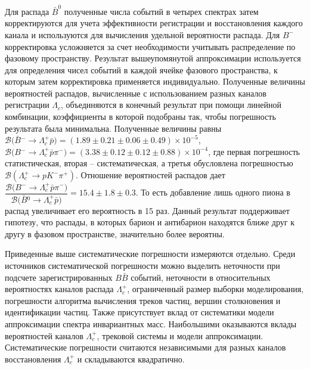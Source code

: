 \documentclass[a4paper, 12pt]{article}
\begin{document}
Для распада $\bar{B}^0$ полученные числа событий в четырех спектрах 
затем корректируются для учета эффективности регистрации 
и восстановления каждого канала и используются для вычисления удельной 
вероятности распада.
%
Для $B^-$ корректировка усложняется за счет необходимости учитывать 
распределение по фазовому пространству. Результат вышеупомянутой 
аппроксимации используется для определения чисел событий в каждой ячейке 
фазового пространства, к которым затем корректировка применяется 
индивидуально.
%
Полученные величины вероятностей распадов, вычисленные с использованием 
разных каналов регистрации $\Lambda_c$, объединяются в конечный 
результат при помощи линейной комбинации, коэффициенты в которой 
подобраны так, чтобы погрешность результата была минимальна.
%
Полученные величины равны
$\mathcal{B} \big(\bar{B}{}^- \to \Lambda_c^+ \bar{p} \big)
= (1.89 \pm 0.21 \pm 0.06 \pm 0.49) \times 10^{-5} $,
$\mathcal{B} \big( {B}{}^- \to \Lambda_c^+ \bar{p} \pi^- \big)
= (3.38 \pm 0.12 \pm 0.12 \pm 0.88) \times 10^{-4} $,
где первая погрешность статистическая, вторая -- систематическая, 
а третья обусловлена погрешностью 
$\mathcal{B}(\Lambda_c^+\to{p}K^-\pi^+)$.
%
Отношение вероятностей распадов дает
$ \dfrac{\mathcal{B} \big( {B}{}^- \to \Lambda_c^+ \bar{p} \pi^- \big)}
{\mathcal{B} \big( \bar{B}{}^0 \to \Lambda_c^+ \bar{p} \big)} =
15.4 \pm 1.8 \pm 0.3 $.
То есть добавление лишь одного пиона в распад увеличивает его 
вероятность в 15 раз. Данный результат поддерживает гипотезу, что 
распады, в которых барион и антибарион находятся ближе друг к другу 
в фазовом пространстве, значительно более вероятны.

Приведенные выше систематические погрешности измеряются отдельно. Среди 
источников систематической погрешности можно выделить неточности при 
подсчете зарегистрированных $B\bar{B}$ событий, неточности 
в относительных вероятностях каналов распада $\Lambda_c^+$, ограниченный 
размер выборки моделирования, погрешности алгоритма вычисления треков 
частиц, вершин столкновения и идентификации частиц. Также присутствует 
вклад от систематики модели аппроксимации спектра инвариантных масс. 
Наибольшими оказываются вклады вероятностей каналов $\Lambda_c^+$, 
трековой системы и модели аппроксимации. Систематические погрешности 
считаются независимыми для разных каналов восстановления $\Lambda_c^+$ 
и складываются квадратично.
\end{document}
